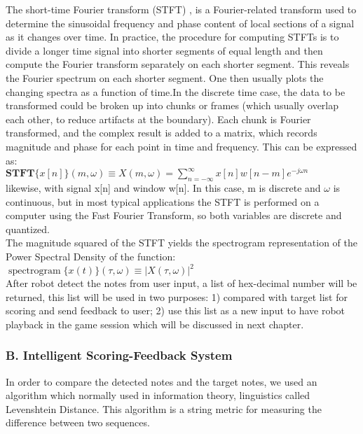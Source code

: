 The short-time Fourier transform (STFT) , is a Fourier-related transform used to 
determine the sinusoidal frequency and phase content of local sections of a signal 
as it changes over time. In practice, the procedure for computing STFTs is to divide 
a longer time signal into shorter segments of equal length and then compute the 
Fourier transform separately on each shorter segment. This reveals the Fourier 
spectrum on each shorter segment. One then usually plots the changing spectra as 
a function of time.In the discrete time case, the data to be transformed could 
be broken up into chunks or frames (which usually overlap each other, to reduce 
artifacts at the boundary). Each chunk is Fourier transformed, and the complex 
result is added to a matrix, which records magnitude and phase for each point in 
time and frequency. This can be expressed as:
\\

${\displaystyle \mathbf {STFT} \{x[n]\}(m,\omega )\equiv X(m,\omega )=\sum _{n=-\infty }^{\infty }x[n]w[n-m]e^{-j\omega n}}$
\\

likewise, with signal x[n] and window w[n]. In this case, m is discrete and $\omega$ 
is continuous, but in most typical applications the STFT is performed on a computer 
using the Fast Fourier Transform, so both variables are discrete and quantized.\\
The magnitude squared of the STFT yields the spectrogram representation of the Power 
Spectral Density of the function:
\\

${\displaystyle \operatorname {spectrogram} \{x(t)\}(\tau ,\omega )\equiv |X(\tau ,\omega )|^{2}}$\\

After robot detect the notes from user input, a list of hex-decimal number will be
returned, this list will be used in two purposes: 1) compared with target list
for scoring and send feedback to user; 2) use this list as a new input to have
robot playback in the game session which will be discussed in next chapter.\\

\subsubsection{B. Intelligent Scoring-Feedback System}
In order to compare the detected notes and the target notes, we used an algorithm
which normally used in information theory, linguistics called Levenshtein Distance.
This algorithm is a string metric for measuring the difference between two sequences.\\

